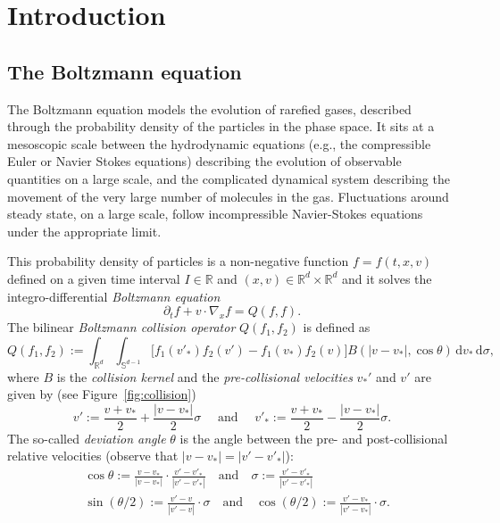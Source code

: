 \documentclass[11pt]{article}
\newcommand{\eg}{e.g.,\xspace}
\theoremstyle{plain}
\theoremstyle{definition}
\numberwithin{equation}{section}
\newcommand{\R}{\mathbb R}
\newcommand{\Sp}{\mathbb S^{d-1}}
\newcommand{\grad} {\nabla}
\newcommand{\dd} {\, \mathrm{d}}
\begin{document}
\section{Introduction}

\subsection{The Boltzmann equation}

The Boltzmann equation models the evolution of rarefied gases,
described through the probability density of the particles in the
phase space. It sits at a mesoscopic scale between the hydrodynamic
equations (\eg the compressible Euler or Navier Stokes equations)
describing the evolution of observable quantities on a large scale,
and the complicated dynamical system describing the movement of the
very large number of molecules in the gas. Fluctuations around steady
state, on a large scale, follow incompressible Navier-Stokes equations
under the appropriate limit.

This probability density of particles is a non-negative function
$f=f(t,x,v)$ defined on a given time interval $I \in \R$ and
$(x,v) \in \R^d \times \R^d$ and it solves the integro-differential
\emph{Boltzmann equation}
\begin{equation}\label{eq:boltzmann}
\partial_t f + v \cdot \grad_x f = Q (f,f).
\end{equation}
The bilinear \emph{Boltzmann collision operator} $Q(f_1,f_2)$ is defined
as
\begin{equation*}
Q (f_1,f_2) := \int_{\R^d} \int_{\Sp} \Big[ f_1(v'_*)f_2(v') - f_1(v_*)f_2(v)
\Big] B(|v-v_*|,\cos \theta) \dd v_* \dd \sigma,
\end{equation*}
where $B$ is the \emph{collision kernel} and the \emph{pre-collisional
velocities} $v_*'$ and $v'$ are given by (see
Figure~\ref{fig:collision})
\[ v' := \frac{v+v_*}2 + \frac{|v-v_*|}2 \sigma \quad \text{ and }
\quad v'_* := \frac{v+v_*}2 - \frac{|v-v_*|}2 \sigma. \] The
so-called \emph{deviation angle} $\theta$ is the angle between the
pre- and post-collisional relative velocities (observe that
$|v-v_*|=|v'-v'_*|$):
\begin{align*}
& \cos \theta := \frac{v-v_*}{|v-v_*|} \cdot
\frac{v'-v'_*}{|v'-v'_*|} \quad \mbox{and} \quad \sigma :=
\frac{v'-v'_*}{|v'-v'_*|} \\
&\sin (\theta/2) := \frac{v'-v}{|v'-v|} \cdot \sigma \quad \mbox{and} \quad
\cos (\theta/2) := \frac{v'-v_*}{|v'-v_*|} \cdot \sigma .
\end{align*}
\end{document}
